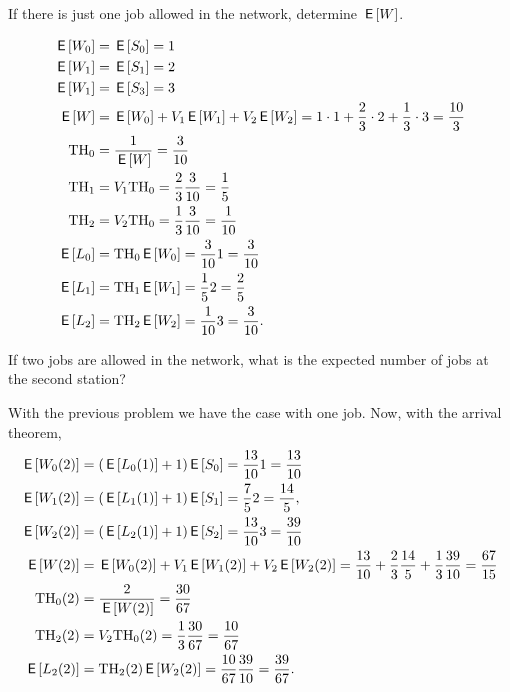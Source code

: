 \begin{exercise}[201807]
  If there is just one job allowed in the network, determine $\E W$.
\begin{solution}
    \begin{align*}
    \E{W_0} &= \E{S_0} = 1\\      
    \E{W_1} &= \E{S_1} = 2\\
    \E{W_1} &= \E{S_3} = 3\\
\E W &= \E{W_0} + V_1 \E{W_1} + V_2 \E{W_2} = 1\cdot 1 + \frac{2}{3}\cdot 2 +  \frac{1}{3} \cdot 3 = \frac{10}{3}\\
\TH_0 &= \frac{1}{\E W} = \frac{3}{10}\\
\TH_1&= V_1 \TH_0 = \frac{2}{3} \frac{3}{10}=\frac{1}{5}\\
\TH_2&= V_2 \TH_0 = \frac{1}{3} \frac{3}{10}=\frac{1}{10}\\
\E{L_0} &= \TH_0 \E{W_0} = \frac{3}{10} 1 = \frac{3}{10}\\
\E{L_1} &= \TH_1 \E{W_1} = \frac{1}{5} 2 = \frac{2}{5}\\
\E{L_2} &= \TH_2 \E{W_2} = \frac{1}{10} 3 = \frac{3}{10}.
    \end{align*}
\end{solution}

\end{exercise}

\begin{exercise}[201807]
If two jobs are allowed in the network, what is the expected number of jobs at the second station?
\begin{solution}
    With the previous problem we have the case with one job. Now, with the arrival theorem,
    \begin{align*}
\E{W_{0}(2)} &= (\E{L_0(1)} + 1)\E{S_0} = \frac{13}{10} 1 = \frac{13}{10} \\
\E{W_{1}(2)} &= (\E{L_1(1)} + 1)\E{S_1} = \frac{7}{5} 2 = \frac{14}{5}, \\
\E{W_{2}(2)} &= (\E{L_2(1)} + 1)\E{S_2} = \frac{13}{10} 3 = \frac{39}{10} \\
\E{W(2)} &= \E{W_0(2)} + V_1 \E{W_1(2)} + V_2 \E{W_2(2)} = \frac{13}{10}+ \frac{2}{3}\frac{14}{5} +  \frac{1}{3}\frac{39}{10}=\frac{67}{15}\\
\TH_0(2) &= \frac{2}{\E{W(2)}} = \frac{30}{67}\\
\TH_2(2) &= V_2 \TH_0(2) = \frac{1}{3} \frac{30}{67}=\frac{10}{67}\\
\E{L_2(2)} &= \TH_2(2) \E{W_2(2)} = \frac{10}{67} \frac{39}{10} = \frac{39}{67}.
    \end{align*}

\end{solution}
\end{exercise}


